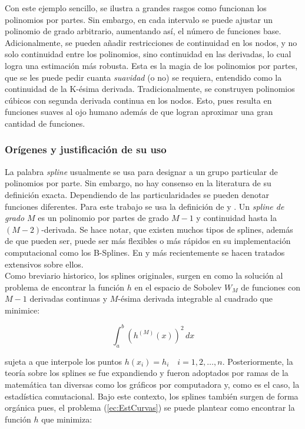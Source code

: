 \documentclass[../Main/Main.tex]{subfiles}
\begin{document}
Con este ejemplo sencillo, se ilustra a grandes rasgos como funcionan los polinomios por partes. Sin embargo, en cada intervalo se puede ajustar un polinomio de grado arbitrario, aumentando así, el número de funciones base. Adicionalmente, se pueden añadir restricciones de continuidad en los nodos, y no solo continuidad entre los polinomios, sino continuidad en las derivadas, lo cual logra una estimación más robusta. Esta es la magia de los polinomios por partes, que se les puede pedir cuanta \textit{suavidad} (o no) se requiera, entendido como la continuidad de la K-ésima derivada. Tradicionalmente, se construyen polinomios cúbicos con segunda derivada continua en los nodos. Esto, pues resulta en funciones suaves al ojo humano además de que logran aproximar una gran cantidad de funciones.

\subsubsection{Orígenes y justificación de su uso}
La palabra \textit{spline} usualmente se usa para designar a un grupo particular de polinomios por parte. Sin embargo, no hay consenso en la literatura de su definición exacta. Dependiendo de las particularidades se pueden denotar funciones diferentes. Para este trabajo se usa la definición de \autocite{wasserman2007all} y \autocite{hastie2008elements}.  Un \textit{spline de grado $M$} es un polinomio por partes de grado $M-1$ y continuidad hasta la $(M-2)$-derivada. Se hace notar, que existen muchos tipos de splines, además de que pueden ser, puede ser más flexibles o más rápidos en su implementación computacional como los B-Splines. En \autocite{deboor1978splines} y más recientemente \autocite{wahba1990splines} se hacen tratados extensivos sobre ellos.\\

Como breviario historico, los splines originales, surgen en \autocite{schoenberg1964spline} como la solución al problema de encontrar la función $h$ en el espacio de Sobolev $W_{M}$ de funciones con $M-1$ derivadas continuas y $M$-ésima derivada integrable al cuadrado que minimice:

$$\int_a^b(h^{(M)}(x))^2\,dx$$ 

sujeta a que interpole los puntos $h(x_i) = h_i \quad i = 1,2,\ldots,n$. Posteriormente, la teoría sobre los splines se fue expandiendo y fueron adoptados por ramas de la matemática tan diversas como los gráficos por computadora y, como es el caso, la estadística comutacional. Bajo este contexto, los splines también surgen de forma orgánica pues, el problema (\ref{ec:EstCurvas}) se puede plantear como encontrar la función $h$ que minimiza:
\end{document}
